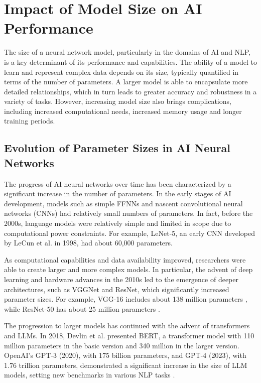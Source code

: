 \section{Impact of Model Size on AI Performance}

The size of a neural network model, particularly in the domains of AI and NLP, is a key determinant of its performance and capabilities. The ability of a model to learn and represent complex data depends on its size, typically quantified in terms of the number of parameters. A larger model is able to encapsulate more detailed relationships, which in turn leads to greater accuracy and robustness in a variety of tasks. However, increasing model size also brings complications, including increased computational needs, increased memory usage and longer training periods.

\subsection{Evolution of Parameter Sizes in AI Neural Networks}

The progress of AI neural networks over time has been characterized by a significant increase in the number of parameters. In the early stages of AI development, models such as simple FFNNs and nascent convolutional neural networks (CNNs) had relatively small numbers of parameters. In fact, before the 2000s, language models were relatively simple and limited in scope due to computational power constraints. For example, LeNet-5, an early CNN developed by LeCun et al. \cite{lecun1998gradient} in 1998, had about 60,000 parameters. 

As computational capabilities and data availability improved, researchers were able to create larger and more complex models. In particular, the advent of deep learning and hardware advances in the 2010s led to the emergence of deeper architectures, such as VGGNet and ResNet, which significantly increased parameter sizes. For example, VGG-16 includes about 138 million parameters \cite{simonyan2014very}, while ResNet-50 has about 25 million parameters \cite{he2016deep}.

The progression to larger models has continued with the advent of transformers and LLMs. In 2018, Devlin et al. \cite{devlin2018bert} presented BERT, a transformer model with 110 million parameters in the basic version and 340 million in the larger version. OpenAI's GPT-3 (2020), with 175 billion parameters, and GPT-4 (2023), with 1.76 trillion parameters, demonstrated a significant increase in the size of LLM models, setting new benchmarks in various NLP tasks \cite{brown2020language, achiam2023gpt}.

